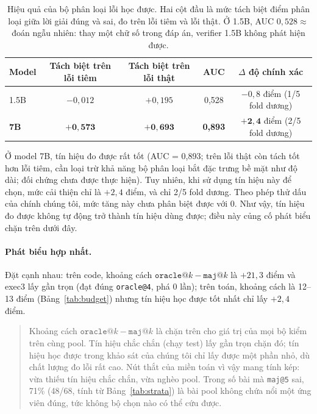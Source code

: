 \documentclass[11pt,a4paper]{article}
\begin{document}
\begin{table}[htbp]
\centering
\small
\begin{tabular}{@{}l c c c c@{}}
\toprule
Model & Tách biệt trên lỗi tiêm & Tách biệt trên lỗi thật & AUC & $\Delta$ độ chính xác\\
\midrule
1.5B & $-0{,}012$ & $+0{,}195$ & 0,528 & $-0{,}8$ điểm (1/5 fold dương)\\
\textbf{7B} & $\mathbf{+0{,}573}$ & $\mathbf{+0{,}693}$ & \textbf{0,893} & $\mathbf{+2{,}4}$ điểm (2/5 fold dương)\\
\bottomrule
\end{tabular}
\caption{Hiệu quả của bộ phân loại lỗi học được. Hai cột đầu là mức tách biệt điểm phân loại
giữa lời giải đúng và sai, đo trên lỗi tiêm và lỗi thật. Ở 1.5B, AUC $0{,}528 \approx$ đoán ngẫu nhiên: thay một chữ số trong
đáp án, verifier 1.5B không phát hiện được.}
\label{tab:clf}
\end{table}

Ở model 7B, tín hiệu đo được rất tốt (AUC = 0,893; trên lỗi thật còn tách tốt hơn lỗi tiêm, cần loại trừ khả năng bộ phân loại bắt đặc trưng bề mặt như độ dài; đối chứng chưa được thực hiện). Tuy nhiên, khi sử dụng tín hiệu này để chọn, mức cải thiện chỉ là $+2{,}4$ điểm, và chỉ 2/5 fold dương. Theo phép thử dấu của chính chúng tôi, mức tăng này chưa phân biệt được với 0. Như vậy, tín hiệu đo được không tự động trở thành tín hiệu dùng được; điều này củng cố phát biểu chặn trên dưới đây.

\paragraph{Phát biểu hợp nhất.}
Đặt cạnh nhau: trên code, khoảng cách $\texttt{oracle@}k-\texttt{maj@}k$ là $+21{,}3$ điểm và exec3 lấy gần trọn (đạt đúng \texttt{oracle@4}, phá 0 lần); trên toán, khoảng cách là 12--13 điểm (Bảng~\ref{tab:budget}) nhưng tín hiệu học được tốt nhất chỉ lấy $+2{,}4$ điểm.

\begin{quote}
Khoảng cách $\texttt{oracle@}k - \texttt{maj@}k$ là chặn trên cho giá trị của mọi bộ kiểm trên cùng pool. Tín hiệu chắc chắn (chạy test) lấy gần trọn chặn đó; tín hiệu học được trong khảo sát của chúng tôi chỉ lấy được một phần nhỏ, dù chất lượng đo lỗi rất cao. Nút thắt của miền toán vì vậy mang tính kép: vừa thiếu tín hiệu chắc chắn, vừa nghèo pool. Trong số bài mà \texttt{maj@5} sai, 71\% (48/68, tính từ Bảng~\ref{tab:strata}) là bài pool không chứa nổi một ứng viên đúng, tức không bộ chọn nào có thể cứu được.
\end{quote}
\end{document}
